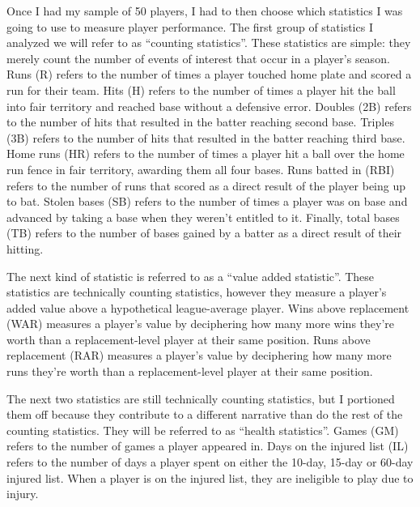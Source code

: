 \documentclass[10pt]{article}
\begin{document}
Once I had my sample of 50 players, I had to then choose which statistics I was going to use to measure player performance. 
The first group of statistics I analyzed we will refer to as “counting statistics”. These statistics are simple: they merely 
count the number of events of interest that occur in a player’s season. Runs (R) refers to the number of times a player touched 
home plate and scored a run for their team. Hits (H) refers to the number of times a player hit the ball into fair territory 
and reached base without a defensive error. Doubles (2B) refers to the number of hits that resulted in the batter reaching 
second base. Triples (3B) refers to the number of hits that resulted in the batter reaching third base. Home runs (HR) refers 
to the number of times a player hit a ball over the home run fence in fair territory, awarding them all four bases. Runs batted 
in (RBI) refers to the number of runs that scored as a direct result of the player being up to bat. Stolen bases (SB) refers 
to the number of times a player was on base and advanced by taking a base when they weren’t entitled to it. Finally, total 
bases (TB) refers to the number of bases gained by a batter as a direct result of their hitting.

The next kind of statistic is referred to as a “value added statistic”. These statistics are technically counting statistics, 
however they measure a player’s added value above a hypothetical league-average player. Wins above replacement (WAR) measures 
a player's value by deciphering how many more wins they’re worth than a replacement-level player at their same position. Runs 
above replacement (RAR) measures a player’s value by deciphering how many more runs they’re worth than a replacement-level 
player at their same position.

The next two statistics are still technically counting statistics, but I portioned them off because they contribute to a 
different narrative than do the rest of the counting statistics. They will be referred to as “health statistics”. Games (GM) 
refers to the number of games a player appeared in. Days on the injured list (IL) refers to the number of days a player spent 
on either the 10-day, 15-day or 60-day injured list. When a player is on the injured list, they are ineligible to play due to 
injury.
\end{document}
